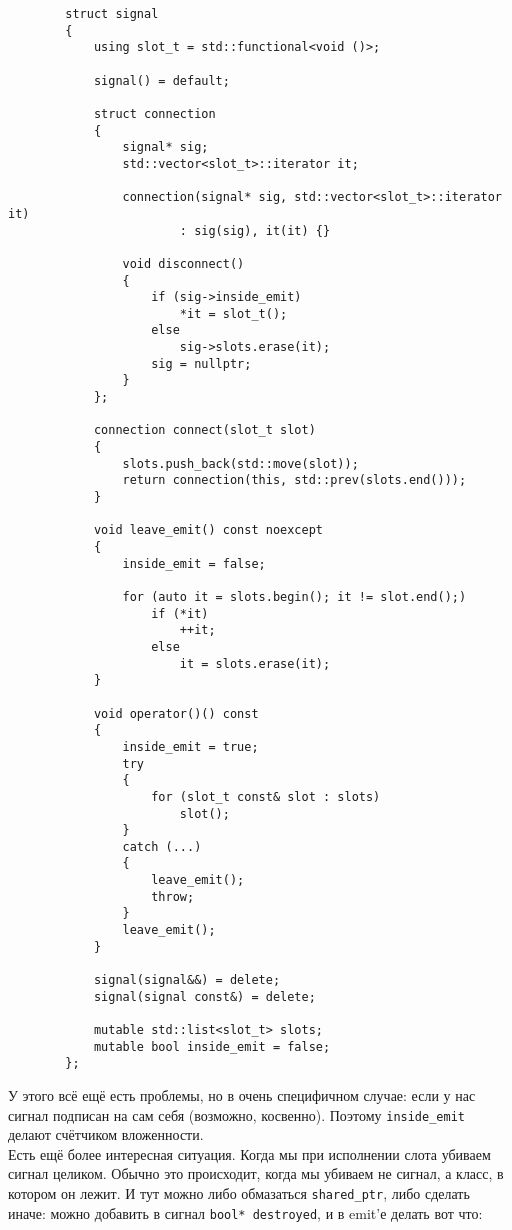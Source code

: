 \documentclass{article}
\begin{document}
    \begin{verbatim}
        struct signal
        {
            using slot_t = std::functional<void ()>;

            signal() = default;

            struct connection
            {
                signal* sig;
                std::vector<slot_t>::iterator it;

                connection(signal* sig, std::vector<slot_t>::iterator it)
                        : sig(sig), it(it) {}

                void disconnect()
                {
                    if (sig->inside_emit)
                        *it = slot_t();
                    else
                        sig->slots.erase(it);
                    sig = nullptr;
                }
            };

            connection connect(slot_t slot)
            {
                slots.push_back(std::move(slot));
                return connection(this, std::prev(slots.end()));
            }

            void leave_emit() const noexcept
            {
                inside_emit = false;
                
                for (auto it = slots.begin(); it != slot.end();)
                    if (*it)
                        ++it;
                    else
                        it = slots.erase(it);
            }

            void operator()() const
            {
                inside_emit = true;
                try
                {
                    for (slot_t const& slot : slots)
                        slot();
                }
                catch (...)
                {
                    leave_emit();
                    throw;
                }
                leave_emit();
            }

            signal(signal&&) = delete;
            signal(signal const&) = delete;

            mutable std::list<slot_t> slots;
            mutable bool inside_emit = false;
        };
    \end{verbatim}
    У этого всё ещё есть проблемы, но в очень специфичном случае: если у нас сигнал подписан на сам себя (возможно, косвенно). Поэтому \texttt{inside_emit} делают счётчиком вложенности.\\
    Есть ещё более интересная ситуация. Когда мы при исполнении слота убиваем сигнал целиком. Обычно это происходит, когда мы убиваем не сигнал, а класс, в котором он лежит. И тут можно либо обмазаться \texttt{shared_ptr}, либо сделать иначе: можно добавить в сигнал \texttt{bool* destroyed}, и в emit'е делать вот что:
\end{document}
